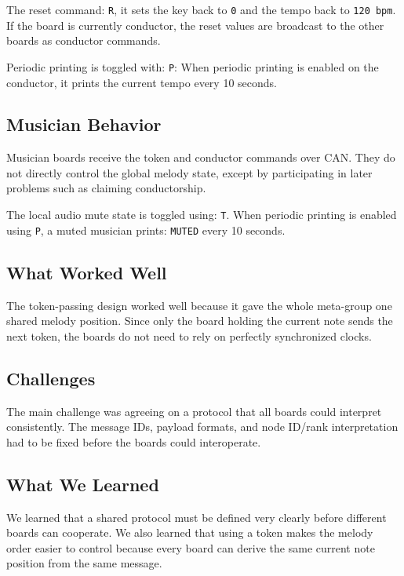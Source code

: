 \documentclass[11pt,a4paper]{article}
\begin{document}
The reset command: \texttt{R}, it sets the key back to \texttt{0} and the tempo back to \texttt{120 bpm}. If the board is currently conductor, the reset values are broadcast to the other boards as conductor commands.

Periodic printing is toggled with: \texttt{P}: When periodic printing is enabled on the conductor, it prints the current tempo every 10 seconds.

\subsection*{Musician Behavior}

Musician boards receive the token and conductor commands over CAN. They do not directly control the global melody state, except by participating in later problems such as claiming conductorship.

The local audio mute state is toggled using: \texttt{T}. When periodic printing is enabled using \texttt{P}, a muted musician prints: \texttt{MUTED} every 10 seconds.

\subsection*{What Worked Well}

The token-passing design worked well because it gave the whole meta-group one shared melody position. Since only the board holding the current note sends the next token, the boards do not need to rely on perfectly synchronized clocks.

\subsection*{Challenges}

The main challenge was agreeing on a protocol that all boards could interpret consistently. The message IDs, payload formats, and node ID/rank interpretation had to be fixed before the boards could interoperate.

\subsection*{What We Learned}

We learned that a shared protocol must be defined very clearly before different boards can cooperate. We also learned that using a token makes the melody order easier to control because every board can derive the same current note position from the same message.
\end{document}
